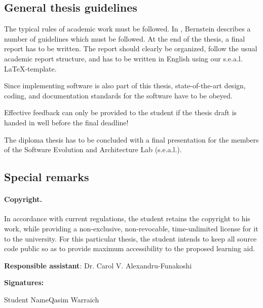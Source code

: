 \documentclass{task_description}
\begin{document}
\subsection*{General thesis guidelines}

The typical rules of academic work must be followed. In
\cite{Bernstein2005-daguide}, Bernstein describes a number of guidelines which
must be followed. At the end of the thesis, a final report has to be
written. The report should clearly be organized, follow the usual academic
report structure, and has to be written in English using our
s.e.a.l. \LaTeX-template.

Since implementing software is also part of this thesis, state-of-the-art
design, coding, and documentation standards for the software have to be obeyed.

Effective feedback can only be provided to the student if the thesis draft is handed in well before the final deadline!

The diploma thesis has to be concluded with a final presentation for the members
of the Software Evolution and Architecture Lab (s.e.a.l.).

\subsection*{Special remarks}
\paragraph{Copyright.}
In accordance with current regulations, the student retains the copyright to his work, while providing a non-exclusive, non-revocable, time-unlimited license for it to the university. For this particular thesis, the student intends to keep all source code public so as to provide maximum accessibility to the proposed learning aid. 

\vspace{2em}
\noindent\textbf{Responsible assistant}: Dr. Carol V. Alexandru-Funakoshi

\vspace{2em}
\noindent\textbf{Signatures:}

\vspace{3\baselineskip}
\noindent Student Name\hfill Qasim Warraich
\vspace{2cm}


\end{document}
